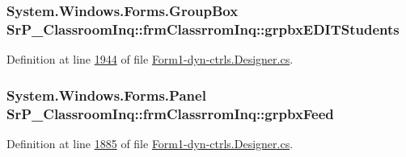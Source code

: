 \hypertarget{class_sr_p___classroom_inq_1_1frm_classrrom_inq_a934cec75a0d91eca5ca9786b078462a3}{
\subsubsection[{grpbx\-E\-D\-I\-T\-Students}]{\setlength{\rightskip}{0pt plus 5cm}\-System.\-Windows.\-Forms.\-Group\-Box {\bf \-Sr\-P\-\_\-\-Classroom\-Inq\-::frm\-Classrrom\-Inq\-::grpbx\-E\-D\-I\-T\-Students}}}
\label{class_sr_p___classroom_inq_1_1frm_classrrom_inq_a934cec75a0d91eca5ca9786b078462a3}


\-Definition at line \hyperlink{_form1-dyn-ctrls_8_designer_8cs_source_l01944}{1944} of file \hyperlink{_form1-dyn-ctrls_8_designer_8cs_source}{\-Form1-\/dyn-\/ctrls.\-Designer.\-cs}.

\hypertarget{class_sr_p___classroom_inq_1_1frm_classrrom_inq_aef19294d5a98aeb9030537fe32d25fde}{
\subsubsection[{grpbx\-Feed}]{\setlength{\rightskip}{0pt plus 5cm}\-System.\-Windows.\-Forms.\-Panel {\bf \-Sr\-P\-\_\-\-Classroom\-Inq\-::frm\-Classrrom\-Inq\-::grpbx\-Feed}}}
\label{class_sr_p___classroom_inq_1_1frm_classrrom_inq_aef19294d5a98aeb9030537fe32d25fde}


\-Definition at line \hyperlink{_form1-dyn-ctrls_8_designer_8cs_source_l01885}{1885} of file \hyperlink{_form1-dyn-ctrls_8_designer_8cs_source}{\-Form1-\/dyn-\/ctrls.\-Designer.\-cs}.


